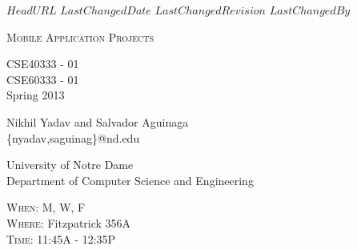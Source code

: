 \svnidlong
{$HeadURL$}
{$LastChangedDate$}
{$LastChangedRevision$}
{$LastChangedBy$}

\thispagestyle{titlepage}

\begin{center}
  \newlength{\parSepLength}
  \setlength{\parSepLength}{10ex}

  \Large
  \centering

  \thinRule\par
  \par\vspace{0.15\parSepLength}
  \begin{minipage}{\textwidth}
    \centering
    \fontsize{40pt}{36pt}\selectfont\titleColor\scshape
    Mobile Application Projects\\
    
  \end{minipage}
  \par\vspace{0.25\parSepLength}
  \par\thinRule

  \vspace{0.125\parSepLength}

  \begin{minipage}{\textwidth}
    \centering
    \large
    CSE40333 - 01 \\
    CSE60333 - 01 \\
    Spring 2013\\
    
  \end{minipage}

  \vfill

  \begin{minipage}{\textwidth}
    \centering
    \Large
    Nikhil Yadav and Salvador Aguinaga\\
    \{nyadav,saguinag\}@nd.edu
  \end{minipage}

  \vfill

  \begin{minipage}{0.8\textwidth}
    \centering
    \small

    \begin{minipage}[t]{0.45\textwidth}
	University of Notre Dame \\
	Department of Computer Science and Engineering\\
	
    \end{minipage}
    \hfill
    \begin{minipage}[t]{0.45\textwidth}
      \raggedleft
      \textsc{When:} M, W, F \\
      \textsc{Where:} Fitzpatrick 356A \\
      \textsc{Time:} 11:45A - 12:35P
    \end{minipage}
  \end{minipage}
\end{center}

